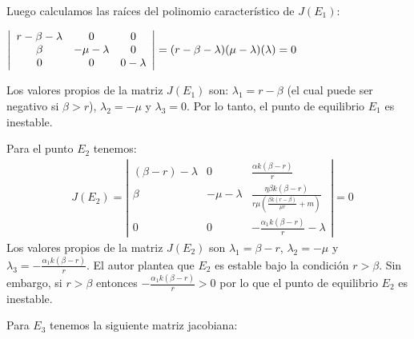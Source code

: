 \documentclass{wscpaperproc}
\theoremstyle{wsc}
\begin{document}
Luego calculamos las raíces del polinomio característico de  $J(E_1)$:
\begin{center}


	$\left|\begin{array}{c c c}
			r-\beta-\lambda & 0            & 0         \\
			\beta           & -\mu-\lambda & 0         \\
			0               & 0            & 0-\lambda \\
		\end{array}	\right|
		=
		(r-\beta-\lambda)(\mu-\lambda)(\lambda) = 0
	$
\end{center}

Los valores propios de la matriz $J(E_1)$ son: $\lambda_1 = r-\beta$ (el cual puede ser negativo si $\beta>r$), $\lambda_2= -\mu$ y $\lambda_3 = 0$. Por lo tanto, el punto de equilibrio $E_1$ es inestable.\par




Para el punto $E_2$ tenemos:
\begin{equation} \label{Equilibrium}
	\begin{aligned}
		 & J\left(E_2\right)=\left|\begin{array}{ccc}
			                           (\beta-r)-\lambda & 0            & \frac{\alpha k(\beta-r)}{r}                                                      \\
			                           \beta             & -\mu-\lambda & \frac{\eta \beta k(\beta-r)}{r \mu\left(\frac{\beta k(r-\beta)}{\mu r}+m\right)} \\
			                           0                 & 0            & -\frac{\alpha_1 k(\beta-r)}{r} - \lambda
		                           \end{array}\right|=0
	\end{aligned}
\end{equation}
Los valores propios de la matriz $J(E_2)$ son $\lambda_1 = \beta-r$, $\lambda_2=-\mu$ y $\lambda_3=-\frac{\alpha_1 k(\beta-r)}{r}$. El autor plantea que $E_2$ es estable bajo la condición $r>\beta$. Sin embargo, si $r>\beta$ entonces $-\frac{\alpha_1 k(\beta-r)}{r} > 0$ por lo que el punto de equilibrio $E_2$ es inestable. \par
Para $E_3$ tenemos la siguiente matriz jacobiana:
\end{document}
